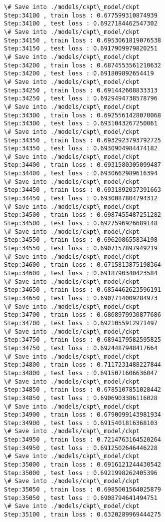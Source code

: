 \documentclass[11pt]{article}
\begin{document}
\begin{Verbatim}[commandchars=\\\{\}]
\# Save into ./models/ckpt\_model/ckpt
Step:34100 , train loss : 0.677599310874939
Step:34100 , test loss : 0.6927184462547302
\# Save into ./models/ckpt\_model/ckpt
Step:34150 , train loss : 0.6953061819076538
Step:34150 , test loss : 0.6917909979820251
\# Save into ./models/ckpt\_model/ckpt
Step:34200 , train loss : 0.6874553561210632
Step:34200 , test loss : 0.691809892654419
\# Save into ./models/ckpt\_model/ckpt
Step:34250 , train loss : 0.691442608833313
Step:34250 , test loss : 0.6929494738578796
\# Save into ./models/ckpt\_model/ckpt
Step:34300 , train loss : 0.6925561428070068
Step:34300 , test loss : 0.6931043267250061
\# Save into ./models/ckpt\_model/ckpt
Step:34350 , train loss : 0.6932923793792725
Step:34350 , test loss : 0.6930904984474182
\# Save into ./models/ckpt\_model/ckpt
Step:34400 , train loss : 0.6931580305099487
Step:34400 , test loss : 0.6930662989616394
\# Save into ./models/ckpt\_model/ckpt
Step:34450 , train loss : 0.6931892037391663
Step:34450 , test loss : 0.6930087804794312
\# Save into ./models/ckpt\_model/ckpt
Step:34500 , train loss : 0.6987455487251282
Step:34500 , test loss : 0.6927596926689148
\# Save into ./models/ckpt\_model/ckpt
Step:34550 , train loss : 0.696208655834198
Step:34550 , test loss : 0.6907157897949219
\# Save into ./models/ckpt\_model/ckpt
Step:34600 , train loss : 0.6715813875198364
Step:34600 , test loss : 0.6918790340423584
\# Save into ./models/ckpt\_model/ckpt
Step:34650 , train loss : 0.6854462623596191
Step:34650 , test loss : 0.6907714009284973
\# Save into ./models/ckpt\_model/ckpt
Step:34700 , train loss : 0.6868979930877686
Step:34700 , test loss : 0.6921055912971497
\# Save into ./models/ckpt\_model/ckpt
Step:34750 , train loss : 0.6894179582595825
Step:34750 , test loss : 0.6924487948417664
\# Save into ./models/ckpt\_model/ckpt
Step:34800 , train loss : 0.7117231488227844
Step:34800 , test loss : 0.6915071606636047
\# Save into ./models/ckpt\_model/ckpt
Step:34850 , train loss : 0.6785107851028442
Step:34850 , test loss : 0.6906903386116028
\# Save into ./models/ckpt\_model/ckpt
Step:34900 , train loss : 0.6790099143981934
Step:34900 , test loss : 0.6915401816368103
\# Save into ./models/ckpt\_model/ckpt
Step:34950 , train loss : 0.7214763164520264
Step:34950 , test loss : 0.6912502646446228
\# Save into ./models/ckpt\_model/ckpt
Step:35000 , train loss : 0.6916121244430542
Step:35000 , test loss : 0.6921998262405396
\# Save into ./models/ckpt\_model/ckpt
Step:35050 , train loss : 0.6985001564025879
Step:35050 , test loss : 0.6908794641494751
\# Save into ./models/ckpt\_model/ckpt
Step:35100 , train loss : 0.6320289969444275

\end{Verbatim}
\end{document}
